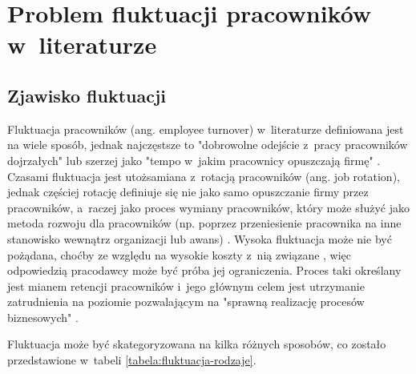 

\chapter{Problem fluktuacji pracowników w~literaturze}\label{ch:knowladge-state}


\section{Zjawisko fluktuacji}\label{sec:zjawisko-fluktuacji}
Fluktuacja pracowników (ang. employee turnover) w~literaturze definiowana jest na wiele sposób, jednak najczęstsze to "dobrowolne odejście z~pracy pracowników dojrzałych" \cite{wozniak-2016}
lub szerzej jako "tempo w~jakim pracownicy opuszczają firmę" \cite{cron-2006}.
Czasami fluktuacja jest utożsamiana z~rotacją pracowników (ang. job rotation),
jednak częściej rotację definiuje się nie jako samo opuszczanie firmy przez pracowników, a~raczej jako proces wymiany pracowników,
który może służyć jako metoda rozwoju dla pracowników (np. poprzez przeniesienie pracownika na inne stanowisko wewnątrz organizacji lub awans) \cite{pocztowski-2009}.
Wysoka fluktuacja może nie być pożądana, choćby ze względu na wysokie koszty z~nią związane \cite{philips-edwards-2009},
więc odpowiedzią pracodawcy może być próba jej ograniczenia.
Proces taki określany jest mianem retencji pracowników i~jego głównym celem jest utrzymanie zatrudnienia na poziomie pozwalającym na "sprawną realizację procesów biznesowych" \cite{pocztowski-2007}.

Fluktuacja może być skategoryzowana na kilka różnych sposobów, co zostało przedstawione w~tabeli \ref{tabela:fluktuacja-rodzaje}.

